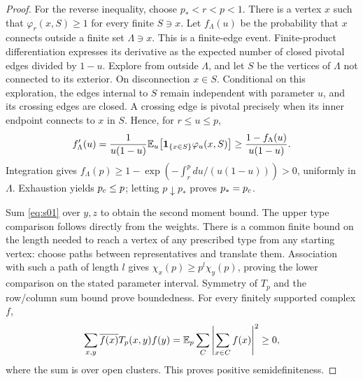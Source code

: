 \begin{proof}
For the reverse inequality, choose $p_*<r<p<1$. There is a vertex $x$
such that $\varphi_r(x,S)\ge1$ for every finite $S\ni x$. Let
$f_\Lambda(u)$ be the probability that $x$ connects outside a finite
set $\Lambda\ni x$. This is a finite-edge event. Finite-product
differentiation expresses its derivative as the expected number of
closed pivotal edges divided by $1-u$.
Explore from outside $\Lambda$, and let $S$ be the vertices of
$\Lambda$ not connected to its exterior. On disconnection $x\in S$.
Conditional on this exploration, the edges internal to $S$ remain
independent with parameter $u$, and its crossing edges are closed.
A crossing edge is pivotal precisely when its inner endpoint connects
to $x$ in $S$. Hence, for $r\le u\le p$,
\[
 f_\Lambda'(u)
 =\frac1{u(1-u)}
   \mathbb E_u\bigl[\mathbf 1_{\{x\in S\}}\varphi_u(x,S)\bigr]
 \ge\frac{1-f_\Lambda(u)}{u(1-u)}.
\]
Integration gives
$f_\Lambda(p)\ge1-\exp(-\int_r^pdu/(u(1-u)))>0$, uniformly in
$\Lambda$. Exhaustion yields ${p_c}\le p$; letting $p\downarrow p_*$
proves $p_*={p_c}$.

Sum \eqref{eq:s01} over $y,z$ to obtain the second moment bound.
The upper type comparison follows directly from the weights.
There is a common finite bound on the length needed to reach a vertex
of any prescribed type from any starting vertex: choose paths between
representatives and translate them. Association with such a path of
length $l$ gives $\chi_x(p)\ge p^l\chi_y(p)$, proving the lower
comparison on the stated parameter interval.
Symmetry of $T_p$ and the row/column sum bound prove boundedness.
For every finitely supported complex $f$,
\[
 \sum_{x,y}\overline{f(x)}T_p(x,y)f(y)
 =\mathbb E_p\sum_{C}\left|\sum_{x\in C}f(x)\right|^2\ge0,
\]
where the sum is over open clusters. This proves positive
semidefiniteness.
\end{proof}

